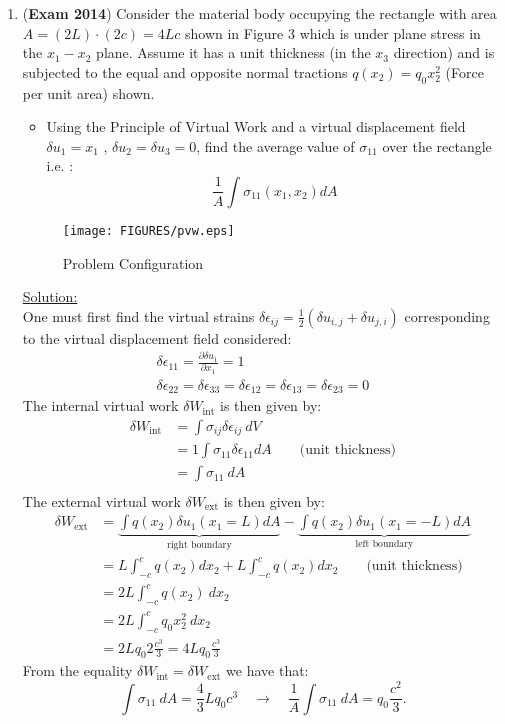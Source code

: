 \documentclass{article}
\newcommand{\ee}{\end{equation}}
\newcommand{\be}{\begin{equation}}
\newcommand{\bi}{\begin{itemize}}
\newcommand{\ei}{\end{itemize}}
\newcommand{\pa}{\partial}
\begin{document}
\begin{enumerate}
\item(\textbf{Exam 2014}) 
Consider the  material body occupying the rectangle with area $A=(2L) \cdot (2c) =4 Lc$ shown in Figure  3 %
which is under plane stress in the $x_1-x_2$ plane. Assume it has a unit thickness (in the $x_3$ direction) and is subjected to the equal and opposite normal tractions $q(x_2)=q_0 x_2^2$ (Force per unit area) shown.
\bi
\item Using the Principle of Virtual Work and a virtual displacement field $\delta u_1= x_1$ , $\delta u_2=\delta u_3=0$, find  the average value of $\sigma_{11}$ over the rectangle i.e. :
\be
\frac{1}{A} \int \sigma_{11}(x_1,x_2) dA 
\ee
\ei
\begin{figure}[!h]
\centering
  \texttt{[image: FIGURES/pvw.eps]}
 \caption{Problem Configuration}
 \label{fig:pvw}
\end{figure}




\underline{Solution:} \\

One must first find the virtual strains $\delta \epsilon_{ij} =\frac{1}{2} (\delta u_{i,j}+\delta u_{j,i})$ corresponding to the virtual displacement field considered:
\be
\begin{array}{l}
 \delta \epsilon_{11} = \frac{ \pa \delta u_1}{\pa x_1}=1 \\
 \delta \epsilon_{22} =\delta \epsilon_{33} =\delta \epsilon_{12} =\delta \epsilon_{13} =\delta \epsilon_{23} =0
\end{array}
\ee
The internal virtual work $\delta W_{\textrm{int}}$ is then given by:
\be
\begin{array}{ll}
 \delta W_{\textrm{int}} & = \int \sigma_{ij} \delta \epsilon_{ij}~dV \\
  & = 1\int \sigma_{11} \delta \epsilon_{11} dA \qquad \textrm{(unit~thickness)} \\
  & = \int \sigma_{11} ~dA \\
\end{array}
\ee
The external virtual work $\delta W_{\textrm{ext}}$ is then given by:
\be
\begin{array}{ll}
 \delta W_{\textrm{ext}} & = \underbrace{\int q(x_2) \delta u_1 (x_1=L) dA}_{\textrm{right~boundary}} - \underbrace{\int q(x_2) \delta u_1 (x_1=-L)
 dA}_{\textrm{left~boundary}} \\
 &= L\int_{-c}^c q(x_2) dx_2 + L\int_{-c}^c q(x_2) dx_2 \qquad \textrm{(unit~thickness)} \\ 
 & = 2 L \int_{ -c}^{c} q(x_2) ~dx_2 \\
 & = 2 L \int_{ -c}^{c} q_0 x_2^2 ~dx_2 \\ 
 & = 2L q_0 2 \frac{c^3}{3} =4Lq_0 \frac{c^3}{3}
 \end{array}
 \ee
 From the equality $\delta W_{\textrm{int}}=\delta W_{\textrm{ext}}$ we have that:
 \be
 \int \sigma_{11} ~dA =\frac{4}{3} Lq_0 c^3 \quad \to \quad \frac{1}{A} \int \sigma_{11} ~dA =q_0 \frac{c^2}{3}.
 \ee
 
 
\end{enumerate}
\end{document}
